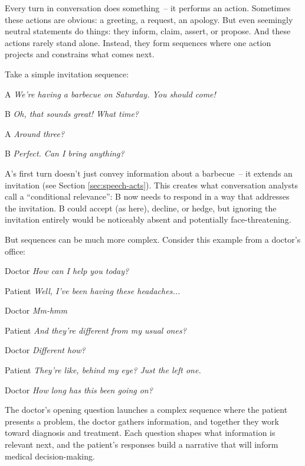 Every turn in conversation does something~-- it performs an action. Sometimes these actions are obvious: a greeting, a request, an apology. But even seemingly neutral statements do things: they inform, claim, assert, or propose. And these actions rarely stand alone. Instead, they form sequences where one action projects and constrains what comes next.

Take a simple invitation sequence:

\ea
\begin{dialogue}
\item[A] \textit{We're having a barbecue on Saturday. You should come!}
\item[B] \textit{Oh, that sounds great! What time?}
\item[A] \textit{Around three?}
\item[B] \textit{Perfect. Can I bring anything?}
\end{dialogue}
\z
A's first turn doesn't just convey information about a barbecue~-- it extends an invitation (see Section \ref{sec:speech-acts}). This creates what conversation analysts call a ``conditional relevance'': B now needs to respond in a way that addresses the invitation. B could accept (as here), decline, or hedge, but ignoring the invitation entirely would be noticeably absent and potentially face-threatening.

But sequences can be much more complex. Consider this example from a doctor's office:

\ea
\begin{dialogue}
\item[Doctor] \textit{How can I help you today?}
\item[Patient] \textit{Well, I've been having these headaches...}
\item[Doctor] \textit{Mm-hmm}
\item[Patient] \textit{And they're different from my usual ones?}
\item[Doctor] \textit{Different how?}
\item[Patient] \textit{They're like, behind my eye? Just the left one.}
\item[Doctor] \textit{How long has this been going on?}
\end{dialogue}
\z
The doctor's opening question launches a complex sequence where the patient presents a problem, the doctor gathers information, and together they work toward diagnosis and treatment. Each question shapes what information is relevant next, and the patient's responses build a narrative that will inform medical decision-making.

